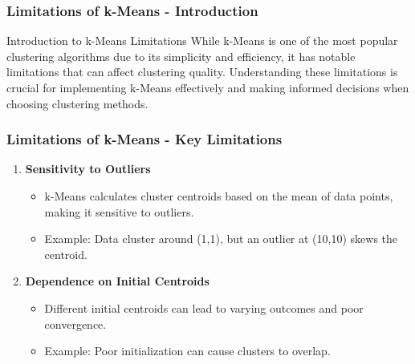 \documentclass[aspectratio=169]{beamer}
\begin{document}
\begin{frame}[fragile]
    \frametitle{Limitations of k-Means - Introduction}
    \begin{block}{Introduction to k-Means Limitations}
        While k-Means is one of the most popular clustering algorithms due to its simplicity and efficiency, it has notable limitations that can affect clustering quality. 
        Understanding these limitations is crucial for implementing k-Means effectively and making informed decisions when choosing clustering methods.
    \end{block}
\end{frame}

\begin{frame}[fragile]
    \frametitle{Limitations of k-Means - Key Limitations}
    \begin{enumerate}
        \item \textbf{Sensitivity to Outliers}
            \begin{itemize}
                \item k-Means calculates cluster centroids based on the mean of data points, making it sensitive to outliers.
                \item Example: Data cluster around (1,1), but an outlier at (10,10) skews the centroid.
            \end{itemize}
        \item \textbf{Dependence on Initial Centroids}
            \begin{itemize}
                \item Different initial centroids can lead to varying outcomes and poor convergence.
                \item Example: Poor initialization can cause clusters to overlap.
            \end{itemize}
    \end{enumerate}
\end{frame}
\end{document}
